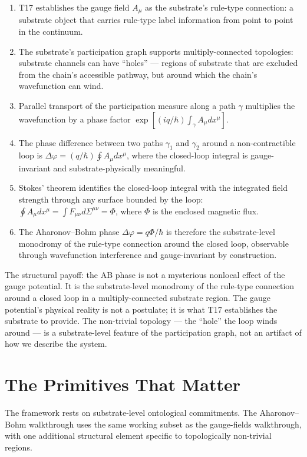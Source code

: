 \documentclass[11pt,a4paper]{article}
\begin{document}
\begin{enumerate}[noitemsep]
  \item T17 establishes the gauge field $A_\mu$ as the substrate's rule-type connection: a substrate object that carries rule-type label information from point to point in the continuum.
  \item The substrate's participation graph supports multiply-connected topologies: substrate channels can have ``holes'' --- regions of substrate that are excluded from the chain's accessible pathway, but around which the chain's wavefunction can wind.
  \item Parallel transport of the participation measure along a path $\gamma$ multiplies the wavefunction by a phase factor $\exp\left[(iq/\hbar)\int_\gamma A_\mu dx^\mu\right]$.
  \item The phase difference between two paths $\gamma_1$ and $\gamma_2$ around a non-contractible loop is $\Delta\varphi = (q/\hbar)\oint A_\mu dx^\mu$, where the closed-loop integral is gauge-invariant and substrate-physically meaningful.
  \item Stokes' theorem identifies the closed-loop integral with the integrated field strength through any surface bounded by the loop: $\oint A_\mu dx^\mu = \int F_{\mu\nu} d\Sigma^{\mu\nu} = \Phi$, where $\Phi$ is the enclosed magnetic flux.
  \item The Aharonov--Bohm phase $\Delta\varphi = q\Phi/\hbar$ is therefore the substrate-level monodromy of the rule-type connection around the closed loop, observable through wavefunction interference and gauge-invariant by construction.
\end{enumerate}

The structural payoff: the AB phase is not a mysterious nonlocal effect of the gauge potential. It is the substrate-level monodromy of the rule-type connection around a closed loop in a multiply-connected substrate region. The gauge potential's physical reality is not a postulate; it is what T17 establishes the substrate to provide. The non-trivial topology --- the ``hole'' the loop winds around --- is a substrate-level feature of the participation graph, not an artifact of how we describe the system.

\section{The Primitives That Matter}

The framework rests on substrate-level ontological commitments. The Aharonov--Bohm walkthrough uses the same working subset as the gauge-fields walkthrough, with one additional structural element specific to topologically non-trivial regions.
\end{document}

